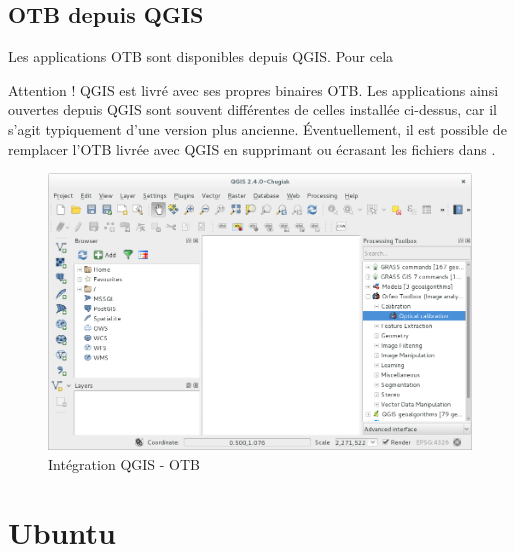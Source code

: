 \documentclass[10pt,a4paper]{article}
\begin{document}
\subsection{OTB depuis QGIS}

Les applications OTB sont disponibles depuis QGIS. Pour cela

Attention ! QGIS est livré avec ses propres binaires OTB. Les applications ainsi
ouvertes depuis QGIS sont souvent différentes de celles installée ci-dessus, car
il s'agit typiquement d'une version plus ancienne.
Éventuellement, il est possible de remplacer l'OTB livrée avec QGIS en supprimant
ou écrasant les fichiers dans \texttt{}.

\begin{figure}[h]
  \center
  \includegraphics[width=1\textwidth]{Art/qgis-otb.png}
  \caption[]{Intégration QGIS - OTB}
  \label{fig:otb-qgis}
\end{figure}

\clearpage
\section{Ubuntu}
\end{document}
